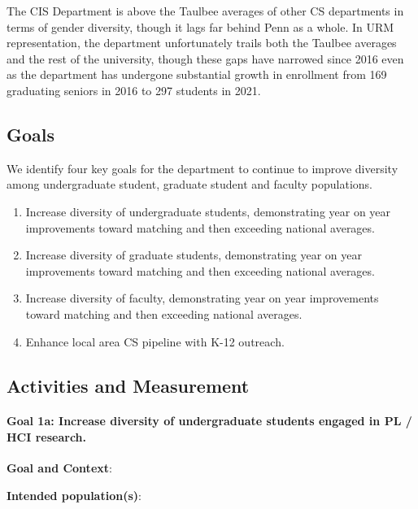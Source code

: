 The CIS Department is above the Taulbee averages of other CS departments in terms of gender diversity, though it lags far behind Penn as a whole. In URM representation, the department unfortunately trails both the Taulbee averages and the rest of the university, though these gaps have narrowed since 2016 even as the department has undergone substantial growth in enrollment from 169 graduating seniors in 2016 to 297 students in 2021.

\subsection*{Goals}

We identify four key goals for the department to continue to improve diversity among undergraduate student, graduate student and faculty populations.
\begin{enumerate}
\item
Increase diversity of undergraduate students, demonstrating year on year improvements toward matching and then exceeding national averages.
\item
Increase diversity of graduate students, demonstrating year on year improvements toward matching and then exceeding national averages.
\item
Increase diversity of faculty, demonstrating year on year improvements toward matching and then exceeding national averages.
\item
Enhance local area CS pipeline with K-12 outreach.
\end{enumerate}

\subsection*{Activities and Measurement}


\paragraph*{Goal 1a: Increase diversity of undergraduate students engaged in PL
/ HCI research.}

\textbf{Goal and Context}:

\textbf{Intended population(s)}:

